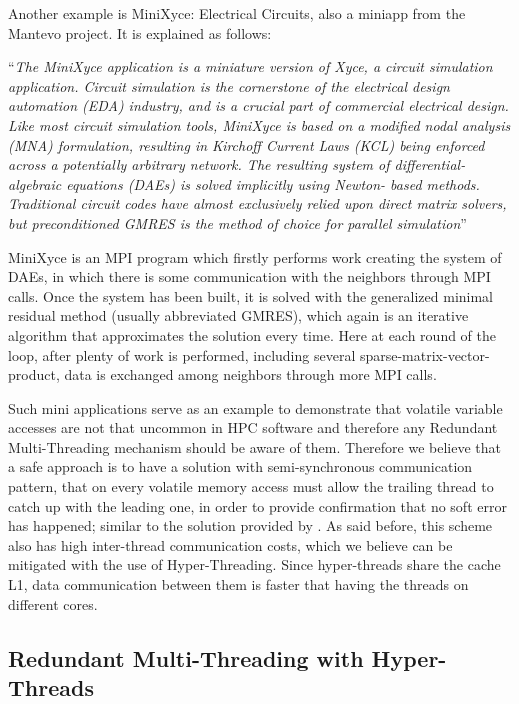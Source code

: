 Another example is MiniXyce: Electrical Circuits, also a miniapp from the Mantevo project. It is explained as follows:

``\emph{The MiniXyce application is a miniature version of Xyce, a circuit simulation application. Circuit simulation is the cornerstone of the electrical design automation (EDA) industry, and is a crucial part of commercial electrical design. Like most circuit simulation tools, MiniXyce is based on a modified nodal analysis (MNA) formulation, resulting in Kirchoff Current Laws (KCL) being enforced across a potentially arbitrary network. The resulting system of differential-algebraic equations (DAEs) is solved implicitly using Newton- based methods. Traditional circuit codes have almost exclusively relied upon direct matrix solvers, but preconditioned GMRES is the method of choice for parallel simulation}''

MiniXyce is an MPI program which firstly performs work creating the system of DAEs, in which there is some communication with the neighbors through MPI calls. Once the system has been built, it is solved with the generalized minimal residual method (usually abbreviated GMRES), which again is an iterative algorithm that approximates the solution every time. Here at each round of the loop, after plenty of work is performed, including several sparse-matrix-vector-product, data is exchanged among neighbors through more MPI calls.

Such mini applications serve as an example to demonstrate that volatile variable accesses are not that uncommon in HPC software and therefore any Redundant Multi-Threading mechanism should be aware of them. Therefore we believe that a safe approach is to have a solution with semi-synchronous communication pattern, that on every volatile memory access must allow the trailing thread to catch up with the leading one, in order to provide confirmation that no soft error has happened; similar to the solution provided by \cite{wang2007compiler}. As said before, this scheme also has high inter-thread communication costs, which we believe can be mitigated with the use of Hyper-Threading. Since hyper-threads share the cache L1, data communication between them is faster that having the threads on different cores. 

\subsection{Redundant Multi-Threading with Hyper-Threads}
\label{subsec:redundantHyper-threading}

